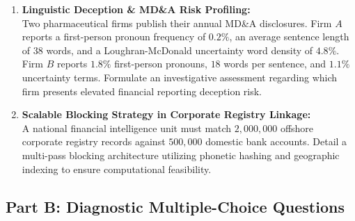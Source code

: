 \begin{enumerate}[label=\textbf{P11.\arabic*}]
    \item \textbf{Linguistic Deception \& MD\&A Risk Profiling:}\\
    Two pharmaceutical firms publish their annual MD\&A disclosures. Firm $A$ reports a first-person pronoun frequency of $0.2\%$, an average sentence length of $38$ words, and a Loughran-McDonald uncertainty word density of $4.8\%$. Firm $B$ reports $1.8\%$ first-person pronouns, $18$ words per sentence, and $1.1\%$ uncertainty terms. Formulate an investigative assessment regarding which firm presents elevated financial reporting deception risk.

    \item \textbf{Scalable Blocking Strategy in Corporate Registry Linkage:}\\
    A national financial intelligence unit must match $2{,}000{,}000$ offshore corporate registry records against $500{,}000$ domestic bank accounts. Detail a multi-pass blocking architecture utilizing phonetic hashing and geographic indexing to ensure computational feasibility.
\end{enumerate}

\subsection*{Part B: Diagnostic Multiple-Choice Questions}

